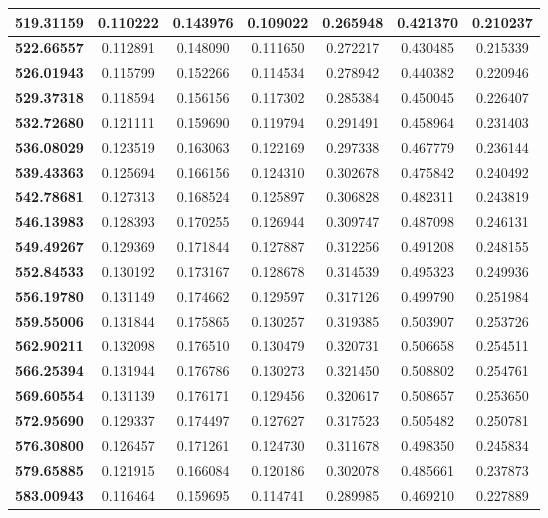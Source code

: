 \documentclass[11pt]{article}
\begin{document}
\begin{appendices}
\begin{longtable}{|c|c|c|c|c|c|c|}
	\textbf{519.31159} & 0.110222 & 0.143976 & 0.109022 & 0.265948 & 0.421370 & 0.210237 \\ \hline
	\textbf{522.66557} & 0.112891 & 0.148090 & 0.111650 & 0.272217 & 0.430485 & 0.215339 \\ \hline
	\textbf{526.01943} & 0.115799 & 0.152266 & 0.114534 & 0.278942 & 0.440382 & 0.220946 \\ \hline
	\textbf{529.37318} & 0.118594 & 0.156156 & 0.117302 & 0.285384 & 0.450045 & 0.226407 \\ \hline
	\textbf{532.72680} & 0.121111 & 0.159690 & 0.119794 & 0.291491 & 0.458964 & 0.231403 \\ \hline
	\textbf{536.08029} & 0.123519 & 0.163063 & 0.122169 & 0.297338 & 0.467779 & 0.236144 \\ \hline
	\textbf{539.43363} & 0.125694 & 0.166156 & 0.124310 & 0.302678 & 0.475842 & 0.240492 \\ \hline
	\textbf{542.78681} & 0.127313 & 0.168524 & 0.125897 & 0.306828 & 0.482311 & 0.243819 \\ \hline
	\textbf{546.13983} & 0.128393 & 0.170255 & 0.126944 & 0.309747 & 0.487098 & 0.246131 \\ \hline
	\textbf{549.49267} & 0.129369 & 0.171844 & 0.127887 & 0.312256 & 0.491208 & 0.248155 \\ \hline
	\textbf{552.84533} & 0.130192 & 0.173167 & 0.128678 & 0.314539 & 0.495323 & 0.249936 \\ \hline
	\textbf{556.19780} & 0.131149 & 0.174662 & 0.129597 & 0.317126 & 0.499790 & 0.251984 \\ \hline
	\textbf{559.55006} & 0.131844 & 0.175865 & 0.130257 & 0.319385 & 0.503907 & 0.253726 \\ \hline
	\textbf{562.90211} & 0.132098 & 0.176510 & 0.130479 & 0.320731 & 0.506658 & 0.254511 \\ \hline
	\textbf{566.25394} & 0.131944 & 0.176786 & 0.130273 & 0.321450 & 0.508802 & 0.254761 \\ \hline
	\textbf{569.60554} & 0.131139 & 0.176171 & 0.129456 & 0.320617 & 0.508657 & 0.253650 \\ \hline
	\textbf{572.95690} & 0.129337 & 0.174497 & 0.127627 & 0.317523 & 0.505482 & 0.250781 \\ \hline
	\textbf{576.30800} & 0.126457 & 0.171261 & 0.124730 & 0.311678 & 0.498350 & 0.245834 \\ \hline
	\textbf{579.65885} & 0.121915 & 0.166084 & 0.120186 & 0.302078 & 0.485661 & 0.237873 \\ \hline
	\textbf{583.00943} & 0.116464 & 0.159695 & 0.114741 & 0.289985 & 0.469210 & 0.227889 \\ \hline

\end{longtable}
\end{appendices}
\end{document}
